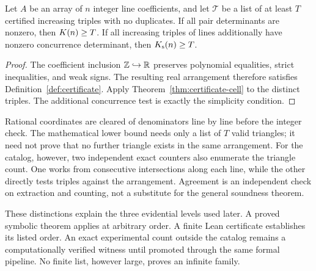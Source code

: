 \begin{proposition}\label{prop:finite-sound}
Let $A$ be an array of $n$ integer line coefficients, and let $\mathcal T$ be a list of at least $T$ certified increasing triples with no duplicates. If all pair determinants are nonzero, then $K(n)\ge T$. If all increasing triples of lines additionally have nonzero concurrence determinant, then $K_{\mathrm{s}}(n)\ge T$.
\end{proposition}
\begin{proof}
The coefficient inclusion $\mathbb{Z}\hookrightarrow\mathbb{R}$ preserves polynomial equalities, strict inequalities, and weak signs. The resulting real arrangement therefore satisfies Definition~\ref{def:certificate}. Apply Theorem~\ref{thm:certificate-cell} to the distinct triples. The additional concurrence test is exactly the simplicity condition.
\end{proof}

Rational coordinates are cleared of denominators line by line before the integer check. The mathematical lower bound needs only a list of $T$ valid triangles; it need not prove that no further triangle exists in the same arrangement. For the catalog, however, two independent exact counters also enumerate the triangle count. One works from consecutive intersections along each line, while the other directly tests triples against the arrangement. Agreement is an independent check on extraction and counting, not a substitute for the general soundness theorem.

These distinctions explain the three evidential levels used later. A proved symbolic theorem applies at arbitrary order. A finite Lean certificate establishes its listed order. An exact experimental count outside the catalog remains a computationally verified witness until promoted through the same formal pipeline. No finite list, however large, proves an infinite family.
